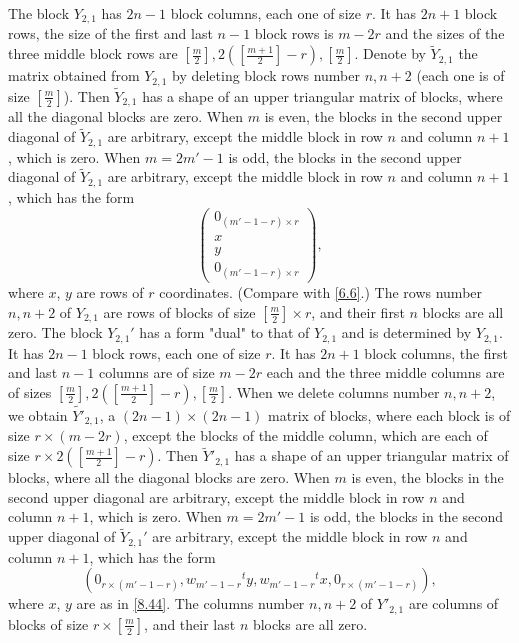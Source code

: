 \documentclass[12pts]{amsart}
\begin{document}
The block $Y_{2,1}$ has $2n-1$ block columns, each one of size $r$. It has $2n+1$ block rows, the size of the first and last $n-1$ block rows is $m-2r$ and the sizes of
the three middle block rows are $[\frac{m}{2}],2([\frac{m+1}{2}]-r),[\frac{m}{2}]$. Denote by
$\widetilde{Y}_{2,1}$ the matrix obtained from $Y_{2,1}$ by deleting
block rows number $n, n+2$ (each one is of size $[\frac{m}{2}]$). Then
$\widetilde{Y}_{2,1}$ has a shape of an upper triangular matrix of blocks, where all the diagonal blocks are zero. When $m$ is even, the blocks in the second upper diagonal of $\widetilde{Y}_{2,1}$ are arbitrary, except the middle block in row $n$ and column $n+1$, which is zero. When $m=2m'-1$ is odd, the blocks in the second upper diagonal of $\widetilde{Y}_{2,1}$ are arbitrary, except the middle block in row $n$ and column $n+1$, which has the form
\begin{equation}\label{8.44}
\begin{pmatrix}0_{(m'-1-r)\times r}\\x\\y\\0_{(m'-1-r)\times r}\end{pmatrix},
\end{equation}
where $x$, $y$ are rows of $r$ coordinates. (Compare with \eqref{6.6}.) The rows number $n, n+2$ of $Y_{2,1}$ are rows of blocks of size $[\frac{m}{2}]\times r$, and their first $n$ blocks are all zero. The block $Y_{2,1}'$ has a form "dual" to that of $Y_{2,1}$ and is determined by $Y_{2,1}$. It has $2n-1$ block rows, each one of size $r$. It has $2n+1$ block
columns, the first and last $n-1$ columns are of size
$m-2r$ each and the three middle columns are of sizes $[\frac{m}{2}],2([\frac{m+1}{2}]-r),[\frac{m}{2}]$.
When we delete columns number $n, n+2$, we obtain
$\widetilde{Y'}_{2,1}$, a $(2n-1)\times (2n-1)$ matrix of blocks, where each block
is of size $r\times (m-2r)$, except the blocks of the middle column, which are each of size $r\times 2([\frac{m+1}{2}]-r)$. Then $\widetilde{Y}'_{2,1}$ has a shape of an upper triangular matrix of blocks, where all the diagonal blocks are zero. When $m$ is even, the blocks in the second upper diagonal are arbitrary, except the middle block in row $n$ and column $n+1$, which is zero. When $m=2m'-1$ is odd, the blocks in the second upper diagonal of $\tilde{Y}_{2,1}'$ are arbitrary, except the middle block in row $n$ and column $n+1$, which has the form
\begin{equation}\label{8.45}
(0_{r\times (m'-1-r)},w_{m'-1-r}{}^ty,w_{m'-1-r}{}^tx,0_{r\times (m'-1-r)}),
\end{equation}
where $x$, $y$ are as in \eqref{8.44}. The columns number $n, n+2$ of $Y'_{2,1}$ are columns of blocks of size $r\times [\frac{m}{2}]$, and their last $n$ blocks are all zero. 
\end{document}
